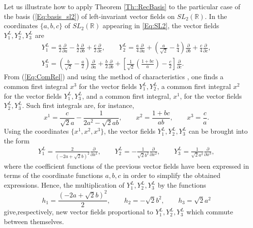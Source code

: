 \documentclass[12pt]{article}
\theoremstyle{plain}
\theoremstyle{definition}
\numberwithin{equation}{section}
\begin{document}
Let us illustrate how to apply Theorem \ref{Th::RecBasis} to the particular case of the basis (\ref{Eq:basis_sl2}) of left-invariant vector fields on $SL_2(\mathbb{R})$. In the coordinates $\{a,b,c\}$ of $SL_2(\mathbb{R})$ appearing in \eqref{Eq:SL2}, the vector fields $Y^L_1,Y_2^L,Y^L_3$ are
\begin{equation}\label{Eq:CoorSL2}
\begin{gathered}
Y^L_1=\frac{a}{2}\frac{\partial}{\partial a}-\frac{b}{2}\frac{\partial}{\partial b}+\frac{c}{2}\frac{\partial}{\partial c},\qquad Y^L_2=\frac{a}{4}\frac{\partial}{\partial a}+\left(\frac{a}{\sqrt{2}}-\frac{b}{4}\right)\frac{\partial}{\partial b}+\frac{c}{4}\frac{\partial}{\partial c},\\
Y^L_3=\left(\frac{b}{\sqrt{2}}-\frac{a}{2}\right)\frac{\partial}{\partial a}+\frac{b}{2}\frac{\partial}{\partial b}+\left[\frac{1}{\sqrt{2}}\left(\frac{1+bc}{a}\right)-\frac{c}{2}\right]\frac{\partial}{\partial c}.
\end{gathered}
\end{equation}
From (\ref{Eq:ComRel}) and using the method of characteristics \cite{Sn06}, one finds a common first integral $x^3$ for the vector fields $Y^L_1,Y^L_2$, a common first integral $x^2$ for the vector fields $Y^L_1,Y^L_3$, and a common first integral, $x^1$, for the vector fields $Y^L_2,Y^L_3$. Such first integrals are, for instance,
\begin{equation*}%
x^1=\frac{c}{\sqrt{2}a}-\frac{1}{2a^2-\sqrt{2} ab},\qquad x^2=\frac{1+bc}{ab},\qquad x^3=\frac{c}{a}.
\end{equation*}
Using the coordinates $\{x^1,x^2,x^3\}$, the vector fields $Y^L_1,Y^L_2,Y^L_3$ can be brought into the form
$$
\begin{gathered}
Y^L_1=\frac{2}{(-2a+\sqrt{2}b)^2}\frac{\partial}{\partial x^1},\qquad Y^L_2=-\frac{1}{\sqrt{2}b^2}\frac{\partial}{\partial x^2},\qquad 
Y^L_3=\frac{1}{\sqrt{2}a^2}\frac{\partial}{\partial x^3},
\end{gathered}
$$
where the coefficient functions of the previous vector fields have been expressed in terms of the coordinate functions $a,b,c$ in order to simplify the obtained expressions.
Hence, the multiplication of $Y^L_1,Y^L_2,Y^L_3$ by the functions 
\begin{equation}\label{Eq:RecFroFun}
h_1=\frac{(-2a+\sqrt{2} b)^2}{2},\qquad h_2=-\sqrt{2}b^2,\qquad h_3=\sqrt{2}a^2 
\end{equation}
give,respectively, new vector fields proportional to $Y^L_1,Y^L_2,Y^L_3$ which commute between themselves. 
\end{document}
